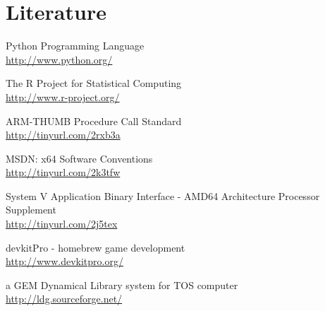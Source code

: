 \newpage

\section{Literature}

\begin{thebibliography}{9}
	Python Programming Language\\
	\url{http://www.python.org/}

	The R Project for Statistical Computing\\
	\url{http://www.r-project.org/}

	ARM-THUMB Procedure Call Standard\\
	\url{http://tinyurl.com/2rxb3a}

	MSDN: x64 Software Conventions\\
	\url{http://tinyurl.com/2k3tfw}

	System V Application Binary Interface - AMD64 Architecture Processor Supplement\\
	\url{http://tinyurl.com/2j5tex}

	devkitPro - homebrew game development\\
	\url{http://www.devkitpro.org/}

	a GEM Dynamical Library system for TOS computer\\
	\url{http://ldg.sourceforge.net/}

\end{thebibliography}

